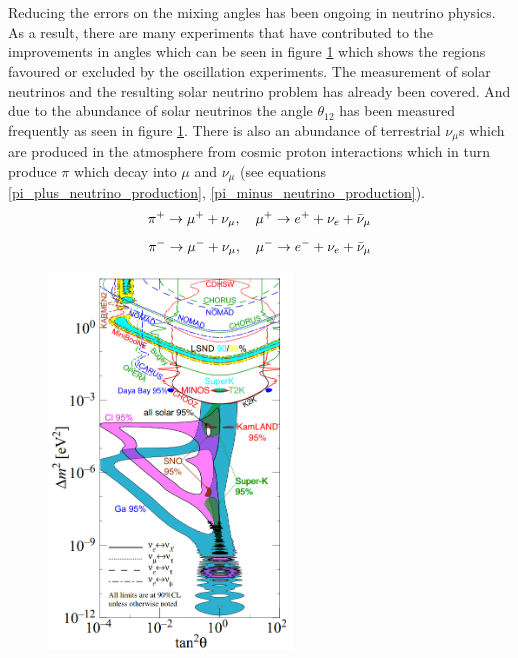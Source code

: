 \\\\Reducing the errors on the mixing angles has been ongoing in neutrino physics. As a result, there are many experiments that have contributed to the improvements in angles which can be seen in figure \ref{neutrino_angles_experiments_variations} 
 which shows the regions favoured or excluded by the oscillation experiments. The measurement of solar neutrinos and the resulting solar neutrino problem has already been covered. And due to the abundance of solar neutrinos the angle $\theta_{12}$ has been measured frequently as seen in figure \ref{neutrino_angles_experiments_variations}. There is also an abundance of terrestrial $\nu_\mu$s which are produced in the atmosphere from cosmic proton interactions which in turn produce $\pi$ which decay into $\mu$ and $\nu_\mu$ \cite{griffiths2008book}\cite{griffiths2008neutrinoOscillations} (see equations \ref{pi_plus_neutrino_production}, \ref{pi_minus_neutrino_production}).
\begin{equation}
    \pi^+ \rightarrow \mu^+ + \nu_\mu,\quad \mu^+ \rightarrow e^+ + \nu_e + \Bar{\nu}_\mu 
    \label{pi_plus_neutrino_production}
\end{equation}
\begin{equation}
    \pi^- \rightarrow \mu^- + \nu_\mu, \quad \mu^- \rightarrow e^- + \nu_e + \Bar{\nu}_\mu 
    \label{pi_minus_neutrino_production}
\end{equation}
\begin{figure}[!h]
 \centering
 \includegraphics[height=100mm]{Chapter1/Figs/Raster/neutrino_angles_experiments_variations.png} %
 \label{neutrino_angles_experiments_variations}
\end{figure}

